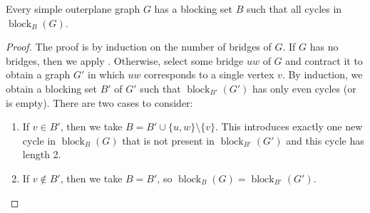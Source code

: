 \documentclass{patmorin}
\DeclareMathOperator{\block}{block}
\begin{document}
\begin{lem}
  Every simple outerplane graph $G$ has a blocking set $B$ such that all cycles
  in $\block_B(G)$. 
\end{lem}

\begin{proof}
  The proof is by induction on the number of bridges of $G$.  If $G$
  has no bridges, then we apply .  Otherwise,
  select some bridge $uw$ of $G$ and contract it to obtain a graph $G'$
  in which $uw$ corresponds to a single vertex $v$.  By induction,
  we obtain a blocking set $B'$ of $G'$ such that $\block_{B'}(G')$
  has only even cycles (or is empty).  There are two cases to consider:
  \begin{enumerate}
    \item If $v\in B'$, then we take $B=B'\cup\{u,w\}\setminus\{v\}$. This introduces exactly one new cycle in $\block_B(G)$ that is not present in $\block_{B'}(G')$ and this cycle has length 2.

    \item If $v\not\in B'$, then we take $B=B'$, so
    $\block_B(G)=\block_{B'}(G')$. \qedhere
  \end{enumerate}
\end{proof}




\end{document}
